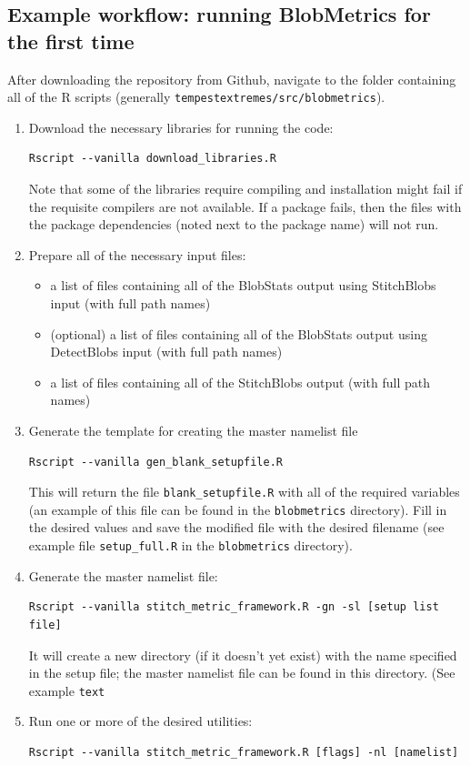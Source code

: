 \documentclass{article}
\begin{document}
\subsection{Example workflow: running BlobMetrics for the first time}

After downloading the repository from Github, navigate to the folder containing all of the R scripts (generally \texttt{tempestextremes/src/blobmetrics}). 
\begin{enumerate}
\item Download the necessary libraries for running the code:
\begin{verbatim}
Rscript --vanilla download_libraries.R
\end{verbatim}

Note that some of the libraries require compiling and installation might fail if the requisite compilers are not available. If a package fails, then the files with the package dependencies (noted next to the package name) will not run. 
\item Prepare all of the necessary input files:
\begin{itemize}
\item a list of files containing all of the BlobStats output using StitchBlobs input (with full path names)
\item (optional) a list of files containing all of the BlobStats output using DetectBlobs input (with full path names)
\item a list of files containing all of the StitchBlobs output (with full path names)
\end{itemize}
\item Generate the template for creating the master namelist file
\begin{verbatim}
Rscript --vanilla gen_blank_setupfile.R
\end{verbatim}

This will return the file \texttt{blank\_setupfile.R} with all of the required variables (an example of this file can be found in the \texttt{blobmetrics} directory). Fill in the desired values and save the modified file with the desired filename (see example file \texttt{setup\_full.R} in the \texttt{blobmetrics} directory).
\item Generate the master namelist file:
\begin{verbatim}
Rscript --vanilla stitch_metric_framework.R -gn -sl [setup list file]
\end{verbatim}

It will create a new directory (if it doesn't yet exist) with the name specified in the setup file; the master namelist file can be found in this directory. (See example \texttt{text}
\item Run one or more of the desired utilities:
\begin{verbatim}
Rscript --vanilla stitch_metric_framework.R [flags] -nl [namelist]
\end{verbatim}
\end{enumerate}
\end{document}
